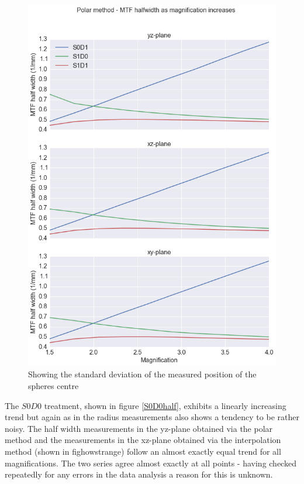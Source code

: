 \documentclass[
  twoside,
  11pt, a4paper,
  footinclude=true,
  headinclude=true,
  cleardoublepage=empty
]{scrbook}
\begin{document}
\begin{figure}[h!]
  \centering
    \includegraphics[width=\textwidth]{figures/polarmtf.png}
    \caption{Showing the standard deviation of the measured position of the spheres centre}
        \label{polarmtf}
\end{figure}

The $S0D0$ treatment, shown in figure \ref{S0D0half}, exhibits a linearly increasing trend but again as in the radius measurements also shows a tendency to be rather noisy. The half width measurements in the yz-plane obtained via the polar method and the measurements in the xz-plane obtained via the interpolation method (shown in fig{howstrange}) follow an almost exactly equal trend for all magnifications. The two series agree almost exactly at all points - having checked repeatedly for any errors in the data analysis a reason for this is unknown.
\end{document}
